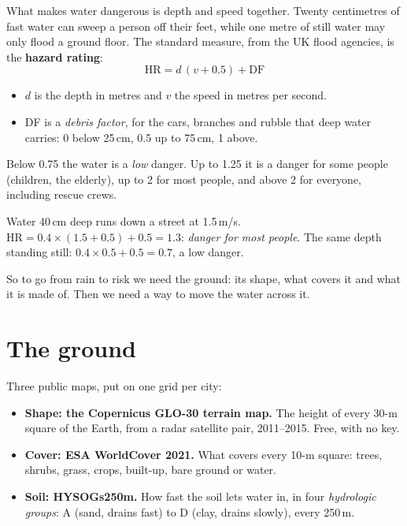 What makes water dangerous is depth and speed together. Twenty centimetres of fast water can sweep a person off their
feet, while one metre of still water may only flood a ground floor. The standard measure, from the UK flood agencies, is
the \textbf{hazard rating}:
\begin{equation}
\text{HR} = d\,(v + 0.5) + \text{DF}
\end{equation}
\begin{itemize}
\item $d$ is the depth in metres and $v$ the speed in metres per second.
\item DF is a \emph{debris factor}, for the cars, branches and rubble that deep water carries: 0 below 25\,cm, 0.5 up to
75\,cm, 1 above.
\end{itemize}
Below 0.75 the water is a \emph{low} danger. Up to 1.25 it is a danger for some people (children, the elderly), up to 2
for most people, and above 2 for everyone, including rescue crews.

\begin{example}
Water 40\,cm deep runs down a street at 1.5\,m/s. $\text{HR} = 0.4 \times (1.5 + 0.5) + 0.5 = 1.3$: \emph{danger for
most people}. The same depth standing still: $0.4 \times 0.5 + 0.5 = 0.7$, a low danger.
\end{example}

So to go from rain to risk we need the ground: its shape, what covers it and what it is made of. Then we need a way to
move the water across it.

\section{The ground}
\label{sec:p5_ground}
Three public maps, put on one grid per city:
\begin{itemize}
\item \textbf{Shape: the Copernicus GLO-30 terrain map.} The height of every 30-m square of the Earth, from a radar
satellite pair, 2011--2015. Free, with no key.
\item \textbf{Cover: ESA WorldCover 2021.} What covers every 10-m square: trees, shrubs, grass, crops, built-up, bare
ground or water.
\item \textbf{Soil: HYSOGs250m.} How fast the soil lets water in, in four \emph{hydrologic groups}: A (sand, drains fast)
to D (clay, drains slowly), every 250\,m.
\end{itemize}

